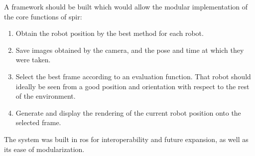   A framework should be built which would allow the modular implementation of the core functions of \gls{spir}:

  \begin{enumerate}
    \item Obtain the robot position by the best method for each robot.
    \item Save images obtained by the camera, and the pose and time at which they were taken.
    \item Select the best frame according to an evaluation function.
          That robot should ideally be seen from a good position and orientation with respect to the rest of the environment.
    \item Generate and display the rendering of the current robot position onto the selected frame.
  \end{enumerate}

  The system was built in \gls{ros} for interoperability and future expansion, as well as its ease of modularization.
